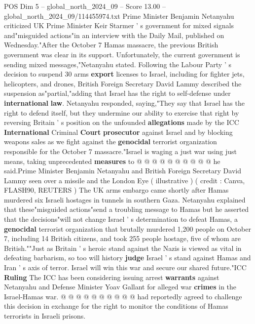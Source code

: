 \begin{textsample}{POS Dim 5 – global\_north\_2024\_09 – Score 13.00 – global\_north\_2024\_09/114455974.txt}  \label{ex:f5_pos_317}
Prime Minister Benjamin Netanyahu criticized UK Prime Minister Keir Starmer ' s government for mixed signals and"misguided actions"in an interview with the Daily Mail, published on Wednesday."After the October 7 Hamas massacre, the previous British government was clear in its support.
Unfortunately, the current government is sending mixed messages,"Netanyahu stated.
Following the Labour Party ' s decision to suspend 30 arms \textbf{export} licenses to Israel, including for fighter jets, helicopters, and drones, British Foreign Secretary David Lammy described the suspension as"partial,"adding that Israel has the right to self-defense under \textbf{international} \textbf{law}.
Netanyahu responded, saying,"They say that Israel has the right to defend itself, but they undermine our ability to exercise that right by reversing Britain ' s position on the unfounded \textbf{allegations} made by the ICC \textbf{International} Criminal \textbf{Court} \textbf{prosecutor} against Israel and by blocking weapons sales as we fight against the \textbf{genocidal} terrorist organization responsible for the October 7 massacre."Israel is waging a just war using just means, taking unprecedented \textbf{measures} to @ @ @ @ @ @ @ @ @ @ he said.Prime Minister Benjamin Netanyahu and British Foreign Secretary David Lammy seen over a missile and the London Eye ( illustrative ) ( credit : Canva, FLASH90, REUTERS ) The UK arms embargo came shortly after Hamas murdered six Israeli hostages in tunnels in southern Gaza.
Netanyahu explained that these"misguided actions"send a troubling message to Hamas but he asserted that the decisions"will not change Israel ' s determination to defeat Hamas, a \textbf{genocidal} terrorist organization that brutally murdered 1,200 people on October 7, including 14 British citizens, and took 255 people hostage, five of whom are British.""Just as Britain ' s heroic stand against the Nazis is viewed as vital in defeating barbarism, so too will history \textbf{judge} Israel ' s stand against Hamas and Iran ' s axis of terror.
Israel will win this war and secure our shared future."ICC \textbf{Ruling} The ICC has been considering issuing arrest \textbf{warrants} against Netanyahu and Defense Minister Yoav Gallant for alleged war \textbf{crimes} in the Israel-Hamas war. @ @ @ @ @ @ @ @ @ @ had reportedly agreed to challenge this decision in exchange for the right to monitor the conditions of Hamas terrorists in Israeli prisons.

\end{textsample}
